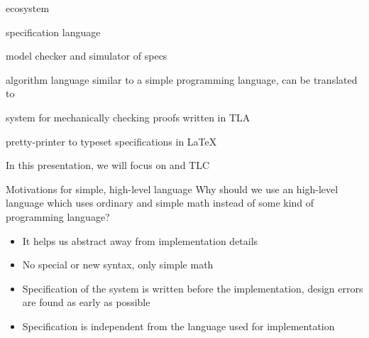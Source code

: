\begin{frame}{\tlap ecosystem}
    \begin{description}
        \item<1->[\tlap] specification language
        \item<1->[TLC] model checker and simulator of \tlap specs
        \item<-1>[PlusCal] algorithm language similar to a simple programming language, can be translated to \tlap
        \item<-1>[TLAPS] system for mechanically checking proofs written in TLA
        \item<-1>[TLATeX] pretty-printer to typeset \tlap specifications in \LaTeX
    \end{description}
    \pause
    \vspace{0.5cm}
    \begin{center}
        In this presentation, we will focus on \tlap and TLC
    \end{center}
\end{frame}


\begin{frame}{Motivations for simple, high-level language}
    Why should we use an high-level language which uses ordinary and simple math instead of some kind of programming language?
    \begin{itemize}[<+->]
        \item It helps us abstract away from implementation details
        \item No special or new syntax, only simple math
        \item Specification of the system is written before the implementation, design errors are found as early as possible
        \item Specification is independent from the language used for implementation
    \end{itemize}
\end{frame}